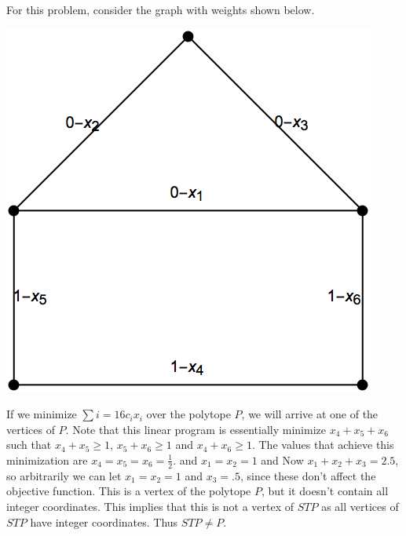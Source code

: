\documentclass[11pt, oneside]{article}
\begin{document}
\begin{enumerate}
\begin{enumerate}
        For this problem, consider the graph with weights shown below.
        \begin{center}
          \includegraphics[scale=.5]{Figures/05_2.png}
        \end{center}

        If we minimize $\sum{i = 1}{6}{c_i x_i}$ over the polytope $P$, we will
        arrive at one of the vertices of $P$.
        Note that this linear program is essentially minimize $x_4 + x_5 + x_6$ such
        that $x_4 + x_5 \ge 1$, $x_5 + x_6 \ge 1$ and $x_4 + x_6 \ge 1$.
        The values that achieve this minimization are
        $x_4 = x_5 = x_6 = \frac{1}{2}$. and $x_1 = x_2 = 1$ and 
        Now $x_1 + x_2 + x_3 = 2.5$, so arbitrarily we can let $x_1 = x_2 = 1$
        and $x_3 = .5$, since these don't affect the objective function.
        This is a vertex of the polytope $P$, but it doesn't contain all integer
        coordinates.
        This implies that this is not a vertex of $STP$ as all vertices of $STP$
        have integer coordinates.
        Thus $STP \neq P$.
    \end{enumerate}


\end{enumerate}
\end{document}
